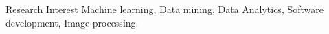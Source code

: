 
\begin{category}{Research Interest}
\citemnobullet Machine learning, Data mining, Data Analytics, Software development, Image processing.\\
\end{category}
